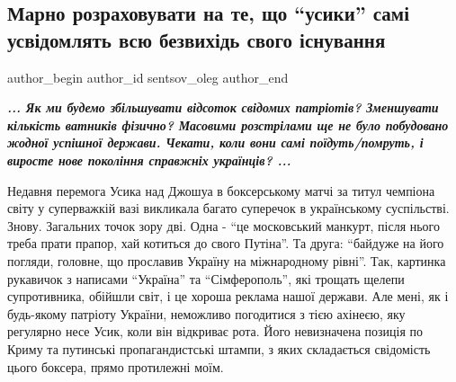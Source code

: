  
 
 
 
 
 
\subsection{Марно розраховувати на те, що \enquote{усики} самі усвідомлять всю безвихідь свого існування}
\label{sec:27_09_2021.fb.sentsov_oleg.1.usik}
 
\ifcmt
 author_begin
   author_id sentsov_oleg
 author_end
\fi


\begin{center}
\begin{fminipage}{0.8\textwidth}
\Large\color{orange}\em\bfseries
...
Як ми будемо збільшувати відсоток свідомих патріотів? Зменшувати кількість
ватників фізично? Масовими розстрілами ще не було побудовано жодної успішної
держави. Чекати, коли вони самі поїдуть/помруть, і виросте нове покоління
справжніх українців?
...
\end{fminipage}
\end{center}

Недавня перемога Усика над Джошуа в боксерському матчі за титул чемпіона світу
у суперважкій вазі викликала багато суперечок в українському суспільстві.
Знову. Загальних точок зору дві. Одна - \enquote{це московський манкурт, після нього
треба прати прапор, хай котиться до свого Путіна}. Та друга: \enquote{байдуже на його
погляди, головне, що прославив Україну на міжнародному рівні}. Так, картинка
рукавичок з написами \enquote{Україна} та \enquote{Сімферополь}, які трощать щелепи
супротивника, обійшли світ, і це хороша реклама нашої держави. Але мені, як і
будь-якому патріоту України, неможливо погодитися з тією ахінеєю, яку регулярно
несе Усик, коли він відкриває рота. Його невизначена позиція по Криму та
путинські пропагандистські штампи, з яких складається свідомість цього боксера,
прямо протилежні моїм. 

